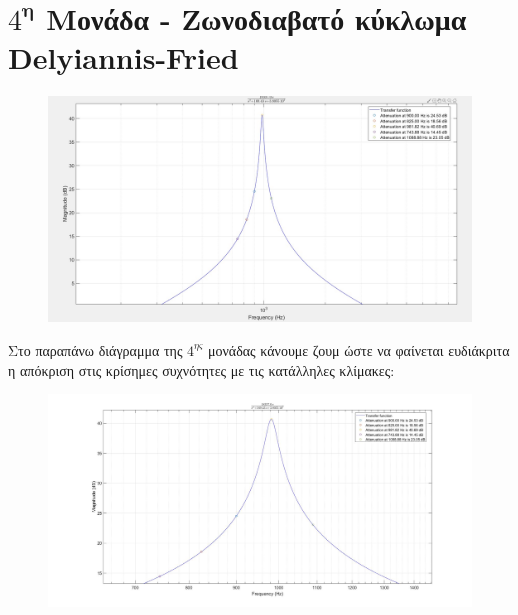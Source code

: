 \documentclass{article}
\begin{document}
{{\section*{$4^\textbf{η}$ Μονάδα - Ζωνοδιαβατό κύκλωμα Delyiannis-Fried} 
  \begin{figure}[h!]
\centering
 	\advance\leftskip-2cm
  \includegraphics[width=160mm,scale=2]{thema2/matlab3.jpg}
\end{figure} 
\normalsize{}
Στο παραπάνω διάγραμμα της $4^{ης}$ μονάδας κάνουμε ζουμ ώστε να φαίνεται ευδιάκριτα η απόκριση στις κρίσημες συχνότητες με τις κατάλληλες κλίμακες:
\large{}
  \begin{figure}[h!]
\centering
 	\advance\leftskip-1cm
  \includegraphics[width=120mm,scale=2]{thema2/z4.jpg}
\end{figure}  
\newpage
}}
\end{document}
